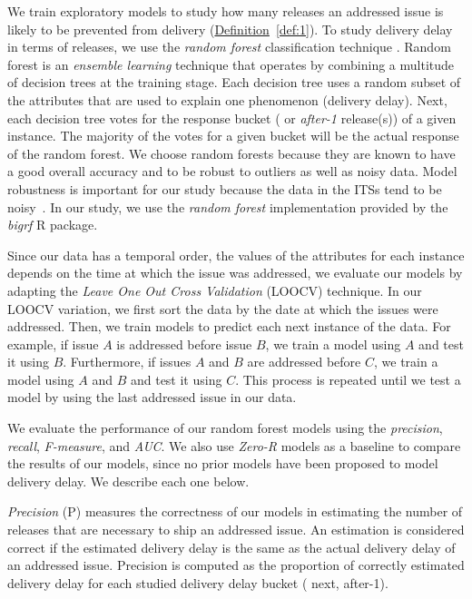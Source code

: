 We train exploratory models to study how many releases an addressed issue is likely
to be prevented from delivery (\hyperref[def:1]{Definition}~\ref{def:1}). To
study delivery delay in terms of releases, we use the \textit{random forest}
classification technique \cite{RandomForest2001}. Random forest is an {\em
ensemble learning} technique that operates by combining a multitude of decision
trees at the training stage.  Each decision tree uses a random subset of the
attributes that are used to explain one phenomenon (\eg delivery delay). Next,
each decision tree votes for the response bucket ( or {\em after-1}
release(s)) of a given instance. The majority of the votes for a given bucket
will be the actual response of the random forest. We choose random forests
because they are known to have a good overall accuracy and to be robust to
outliers as well as noisy data. Model robustness is important for our study
because the data in the ITSs tend to be noisy~\cite{Herraiz2008}. In our study,
we use the \textit{random forest} implementation provided by the \textit{bigrf}
R package. 

Since our data has a temporal order, \ie the values of the attributes for each
instance depends on the time at which the issue was addressed, we evaluate our
models by adapting the {\em Leave One Out Cross Validation} (LOOCV) technique.
In our LOOCV variation, we first sort the data by the date at which the issues
were addressed. Then, we train models to predict each next instance of the data. For
example, if issue $A$ is addressed before issue $B$, we train a model using $A$ and
test it using $B$. Furthermore, if issues $A$ and $B$ are addressed before $C$, we
train a model using $A$ and $B$ and test it using $C$. This process is repeated
until we test a model by using the last addressed issue in our data.

We evaluate the performance of our random forest models using the
\textit{precision}, \textit{recall}, \textit{F-measure}, and \textit{AUC}. We
also use \textit{Zero-R} models as a baseline to compare the results of our
models, since no prior models have been proposed to model delivery delay. We
describe each one below.

\textit{Precision} (P) measures the correctness of our models in estimating the
number of releases that are necessary to ship an addressed issue. An estimation is
considered correct if the estimated delivery delay is the same as the actual
delivery delay of an addressed issue. Precision is computed as the proportion of
correctly estimated delivery delay for each studied delivery delay bucket (\eg
next, after-1).

